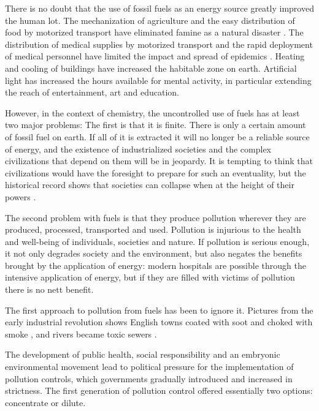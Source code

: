 There is no doubt that the use of fossil fuels as an energy source greatly
improved the human lot. The mechanization of agriculture and the easy
distribution of food by motorized transport have eliminated famine as a natural
disaster \autocite{Angelis2007}. The distribution of medical supplies by
motorized transport and the rapid deployment of medical personnel have limited
the impact and spread of epidemics \autocite{Ministere2018}. Heating and cooling
of buildings have increased the habitable zone on earth. Artificial light has
increased the hours available for mental activity, in particular extending the
reach of entertainment, art and education.

However, in the context of chemistry, the uncontrolled use of fuels has at least
two major problems: The first is that it is finite. There is only a certain
amount of fossil fuel on earth. If all of it is extracted it will no longer be a
reliable source of energy, and the existence of industrialized societies and the
complex civilizations that depend on them will be in jeopardy. It is tempting to
think that civilizations would have the foresight to prepare for such an
eventuality, but the historical record shows that societies can collapse when at
the height of their powers \autocite{Diamond2006}.

The second problem with fuels is that they produce pollution wherever they are
produced, processed, transported and used. Pollution is injurious to the health
and well-being of individuals, societies and nature. If pollution is serious
enough, it not only degrades society and the environment, but also negates the
benefits brought by the application of energy: modern hospitals are possible
through the intensive application of energy, but if they are filled with victims
of pollution there is no nett benefit.

The first approach to pollution from fuels has been to ignore it. Pictures
from the early industrial revolution shows English towns coated with soot and
choked with smoke \autocite{Flick1980}, and rivers became toxic
sewers \autocite{Halliday2001}.

The development of public health, social responsibility \autocite{Szreter2003}
and an embryonic environmental movement \autocite{Williams1965} lead to
political pressure for the implementation of pollution controls, which
governments gradually introduced and increased in strictness. The first
generation of pollution control offered essentially two options:
concentrate or dilute.

